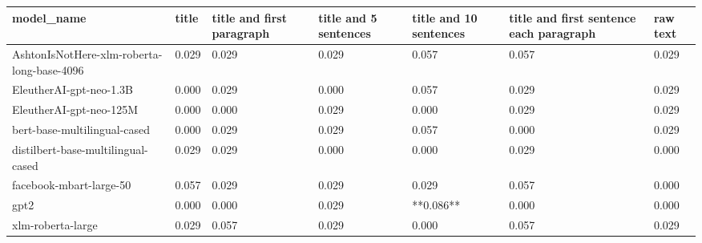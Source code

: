 \begin{tabular}{lllllll}
\toprule
                                model\_name & title & title and first paragraph & title and 5 sentences & title and 10 sentences & title and first sentence each paragraph & raw text \\
\midrule
AshtonIsNotHere-xlm-roberta-long-base-4096 & 0.029 &                     0.029 &                 0.029 &                  0.057 &                                   0.057 &    0.029 \\
                   EleutherAI-gpt-neo-1.3B & 0.000 &                     0.029 &                 0.000 &                  0.057 &                                   0.029 &    0.029 \\
                   EleutherAI-gpt-neo-125M & 0.000 &                     0.000 &                 0.029 &                  0.000 &                                   0.029 &    0.029 \\
              bert-base-multilingual-cased & 0.000 &                     0.029 &                 0.029 &                  0.057 &                                   0.000 &    0.029 \\
        distilbert-base-multilingual-cased & 0.029 &                     0.029 &                 0.000 &                  0.000 &                                   0.029 &    0.000 \\
                   facebook-mbart-large-50 & 0.057 &                     0.029 &                 0.029 &                  0.029 &                                   0.057 &    0.000 \\
                                      gpt2 & 0.000 &                     0.000 &                 0.029 &              **0.086** &                                   0.000 &    0.000 \\
                         xlm-roberta-large & 0.029 &                     0.057 &                 0.029 &                  0.000 &                                   0.057 &    0.029 \\
\bottomrule
\end{tabular}
